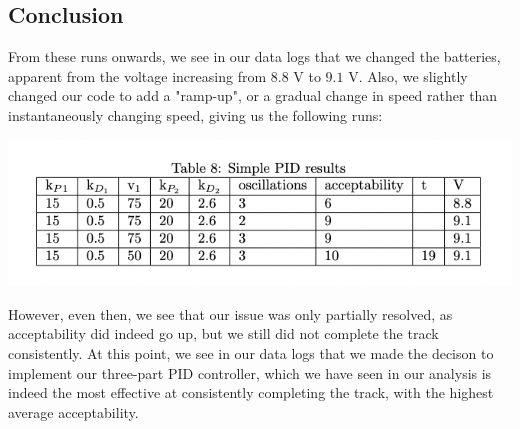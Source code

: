 \documentclass[12pt]{article}
\begin{document}
\begin{multicols}{2}
\section*{Conclusion}
From these runs onwards, we see in our data logs that we changed the batteries, apparent from the voltage increasing from $8.8$ V to $9.1$ V. Also, we slightly changed our code to add a "ramp-up", or a gradual change in speed
rather than instantaneously changing speed, giving us the following runs:
\begin{center}
    \includegraphics*[scale=0.5]{Table8.png}
\end{center}
However, even then, we see that our issue was only partially resolved, as acceptability did indeed go up, but we still did not complete the track consistently.
At this point, we see in our data logs that we made the decison to implement our three-part PID controller, which we have seen in our analysis is indeed the most effective at consistently completing the track, with the highest 
average acceptability. 
\end{multicols}
\end{document}
